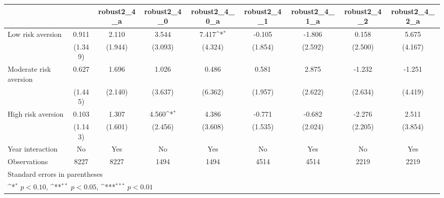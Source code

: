 {
\def\sym#1{\ifmmode^{#1}\else\(^{#1}\)\fi}
\begin{tabular}{l*{8}{c}}
\toprule
                &\multicolumn{1}{c}{}&\multicolumn{1}{c}{robust2\_4\_a}&\multicolumn{1}{c}{robust2\_4\_0}&\multicolumn{1}{c}{robust2\_4\_0\_a}&\multicolumn{1}{c}{robust2\_4\_1}&\multicolumn{1}{c}{robust2\_4\_1\_a}&\multicolumn{1}{c}{robust2\_4\_2}&\multicolumn{1}{c}{robust2\_4\_2\_a}\\
\midrule
Low risk aversion&    0.911         &    2.110         &    3.544         &    7.417\sym{*}  &   -0.105         &   -1.806         &    0.158         &    5.675         \\
                &  (1.349)         &  (1.944)         &  (3.093)         &  (4.324)         &  (1.854)         &  (2.592)         &  (2.500)         &  (4.167)         \\
\addlinespace
Moderate risk aversion&    0.627         &    1.696         &    1.026         &    0.486         &    0.581         &    2.875         &   -1.232         &   -1.251         \\
                &  (1.445)         &  (2.140)         &  (3.637)         &  (6.362)         &  (1.957)         &  (2.622)         &  (2.634)         &  (4.419)         \\
\addlinespace
High risk aversion&    0.103         &    1.307         &    4.560\sym{*}  &    4.386         &   -0.771         &   -0.682         &   -2.276         &    2.511         \\
                &  (1.143)         &  (1.601)         &  (2.456)         &  (3.608)         &  (1.535)         &  (2.024)         &  (2.205)         &  (3.854)         \\
\addlinespace
Year interaction &       No         &      Yes         &       No         &      Yes         &       No         &      Yes         &       No         &      Yes         \\
\midrule
Observations    &     8227         &     8227         &     1494         &     1494         &     4514         &     4514         &     2219         &     2219         \\
\bottomrule
\multicolumn{9}{l}{\footnotesize Standard errors in parentheses}\\
\multicolumn{9}{l}{\footnotesize \sym{*} \(p<0.10\), \sym{**} \(p<0.05\), \sym{***} \(p<0.01\)}\\
\end{tabular}
}
